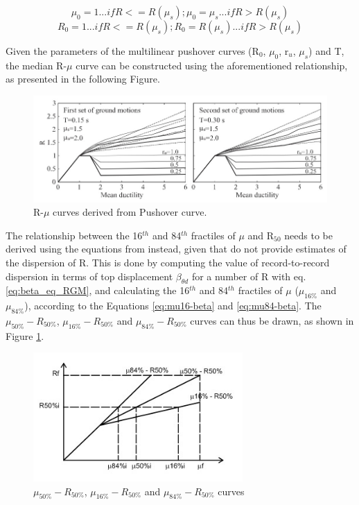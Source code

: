 \begin{equation}
\mu_0= 1 ... if R<=R(\mu_s); \mu_0 = \mu_s ... if R>R(\mu_s)
\end{equation}
\begin{equation}
R_0= 1 ... if R<=R(\mu_s); R_0 = R(\mu_s) ... if R>R(\mu_s)
\end{equation}

Given the parameters of the multilinear pushover curves (R$_{0}$, $\mu_{0}$, r$_{u}$, $\mu_s$) and T, the median R-$\mu$ curve can be constructed using the aforementioned relationship, as presented in the following Figure.
 
\begin{figure}[!htbp]
\centering
\includegraphics[width=15cm]{figures/DF_R-mu.jpg}
\caption{R-$\mu$ curves derived from Pushover curve.}
\end{figure}

The relationship between the 16$^{th}$ and 84$^{th}$ fractiles of $\mu$ and R$_{50}$ needs to be derived using the equations from \citep{RuizGarciaMiranda2007} instead, given that \citep{DolsekFajfar2004} do not provide estimates of the dispersion of R. This is done by computing the value of record-to-record dispersion in terms of top displacement $\beta_{\theta d}$ for a number of R with eq. \ref{eq:beta_eq_RGM}, and calculating the 16$^{th}$ and 84$^{th}$ fractiles of $\mu$ ($\mu_{16\%}$ and $\mu_{84\%}$), according to the Equations \ref{eq:mu16-beta} and \ref{eq:mu84-beta}. The $\mu_{50\%}-R_{50\%}$, $\mu_{16\%}-R_{50\%}$ and $\mu_{84\%}-R_{50\%}$ curves can thus be drawn, as shown in Figure \ref{fig:R-mu}.

\begin{figure}[!htbp]
\centering
\includegraphics[width=8cm]{figures/Rmu.jpg}
\caption{$\mu_{50\%}-R_{50\%}$, $\mu_{16\%}-R_{50\%}$ and $\mu_{84\%}-R_{50\%}$ curves}
\label{fig:R-mu}
\end{figure}

